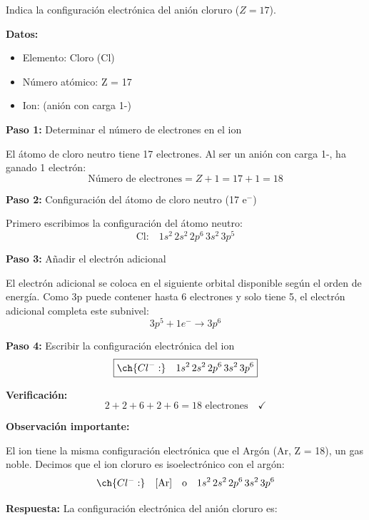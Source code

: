 \begin{exercise}
    Indica la configuración electrónica del anión cloruro  (\( Z = 17 \)).
    \begin{solu}
        \textbf{Datos:}
        \begin{itemize}
            \item Elemento: Cloro (Cl)
            \item Número atómico: Z = 17
            \item Ion:  (anión con carga 1-)
        \end{itemize}

        \textbf{Paso 1:} Determinar el número de electrones en el ion

        El átomo de cloro neutro tiene 17 electrones. Al ser un anión con carga 1-, ha ganado 1 electrón:
        \[
            \text{Número de electrones} = Z + 1 = 17 + 1 = 18
        \]

        \textbf{Paso 2:} Configuración del átomo de cloro neutro (17 e\(^-\))

        Primero escribimos la configuración del átomo neutro:
        \[
            \text{Cl:} \quad 1s^2 \, 2s^2 \, 2p^6 \, 3s^2 \, 3p^5
        \]

        \textbf{Paso 3:} Añadir el electrón adicional

        El electrón adicional se coloca en el siguiente orbital disponible según el orden de energía. Como 3p puede contener hasta 6 electrones y solo tiene 5, el electrón adicional completa este subnivel:
        \[
            3p^5 + 1e^- \rightarrow 3p^6
        \]

        \textbf{Paso 4:} Escribir la configuración electrónica del ion
        \[
            \boxed{\ch{Cl^{-}:} \quad 1s^2 \, 2s^2 \, 2p^6 \, 3s^2 \, 3p^6}
        \]

        \textbf{Verificación:}
        \[
            2 + 2 + 6 + 2 + 6 = 18 \text{ electrones} \quad \checkmark
        \]

        \textbf{Observación importante:}

        El ion  tiene la misma configuración electrónica que el Argón (Ar, Z = 18), un gas noble. Decimos que el ion cloruro es isoelectrónico con el argón:
        \[
            \ch{Cl^{-}:} \quad [\text{Ar}] \quad \text{o} \quad 1s^2 \, 2s^2 \, 2p^6 \, 3s^2 \, 3p^6
        \]

        \textbf{Respuesta:} La configuración electrónica del anión cloruro es: 
    \end{solu}
\end{exercise}
